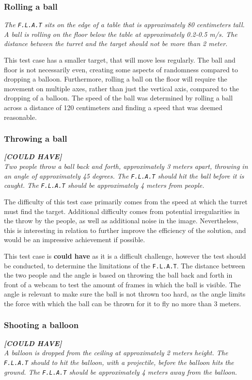 \subsubsection{Rolling a ball}
\textit{The \texttt{F.L.A.T} sits on the edge of a table that is approximately 80 centimeters tall.
A ball is rolling on the floor below the table at approximately 0.2-0.5 m/s.
The distance between the turret and the target should not be more than 2 meter.}

This test case has a smaller target, that will move less regularly.
The ball and floor is not necessarily even, creating some aspects of randomness compared to dropping a balloon.
Furthermore, rolling a ball on the floor will require the movement on multiple axes, rather than just the vertical axis, compared to the dropping of a balloon.
The speed of the ball was determined by rolling a ball across a distance of 120 centimeters and finding a speed that was deemed reasonable.

\subsubsection{Throwing a ball}
\textit{\textbf{[COULD HAVE]}}\\
\textit{Two people throw a ball back and forth, approximately 3 meters apart, throwing in an angle of approximately 45 degrees.
The \texttt{F.L.A.T} should hit the ball before it is caught.
The \texttt{F.L.A.T} should be approximately 4 meters from people.}

The difficulty of this test case primarily comes from the speed at which the turret must find the target.
Additional difficulty comes from potential irregularities in the throw by the people, as well as additional noise in the image.
Nevertheless, this is interesting in relation to further improve the efficiency of the solution, and would be an impressive achievement if possible.

This test case is \textbf{could have} as it is a difficult challenge, however the test should be conducted, to determine the limitations of the \texttt{F.L.A.T}.
The distance between the two people and the angle is based on throwing the ball back and forth in front of a webcam to test the amount of frames in which the ball is visible.
The angle is relevant to make sure the ball is not thrown too hard, as the angle limits the force with which the ball can be thrown for it to fly no more than 3 meters.

\subsubsection{Shooting a balloon}
\textit{\textbf{[COULD HAVE]}}\\
\textit{A balloon is dropped from the ceiling at approximately 2 meters height.
The \texttt{F.L.A.T} should to hit the balloon, with a projectile, before the balloon hits the ground.
The \texttt{F.L.A.T} should be approximately 4 meters away from the balloon.}

